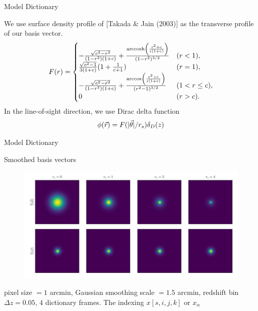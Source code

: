 \documentclass[10pt]{beamer}
\begin{document}
\begin{frame}{Model Dictionary}

We use surface density profile of [Takada \& Jain (2003)] as the transverse profile of our basis vector.
\begin{equation}\notag
F(r)=
\begin{cases}
-\frac{\sqrt{c^2-r^2}}{(1-r^2)(1+c)} + \frac{\rm{arccosh} \left(\frac{r^2+c}{r(1+c)}\right)}{(1-r^2)^{3/2}}  & (r<1),\\
\frac{\sqrt{c^2-1}}{3(1+c)} (1+\frac{1}{c+1}) & (r=1),\\
-\frac{\sqrt{c^2-r^2}}{(1-r^2)(1+c)} + \frac{\rm{arccos} \left(\frac{r^2+c}{r(1+c)}\right)}{(r^2-1)^{3/2}} & (1<r\leq c),\\
0& (r>c).
\end{cases}
\end{equation}
In the line-of-sight direction, we use Dirac delta function
\begin{equation}\notag
 \phi(\vec{r})=F(|\vec{\theta}|/r_s) \delta_D(z)
\end{equation}
\end{frame}

\begin{frame}{Model Dictionary}
\begin{alertblock}{Smoothed basis vectors}
\begin{figure}
\centering
\includegraphics[height=.5\textwidth]{../paper_ms_method_HSCY1/nfwlet-atom-2D.pdf}
\end{figure}

\small pixel size $=1$ arcmin,
\small Gaussian smoothing scale $=1.5$ arcmin,
\small redshift bin $\Delta z=0.05$,
\small $4$ dictionary frames.
The indexing $x[s,i,j,k]$ or $x_\alpha$
\end{alertblock}
\end{frame}
\end{document}
